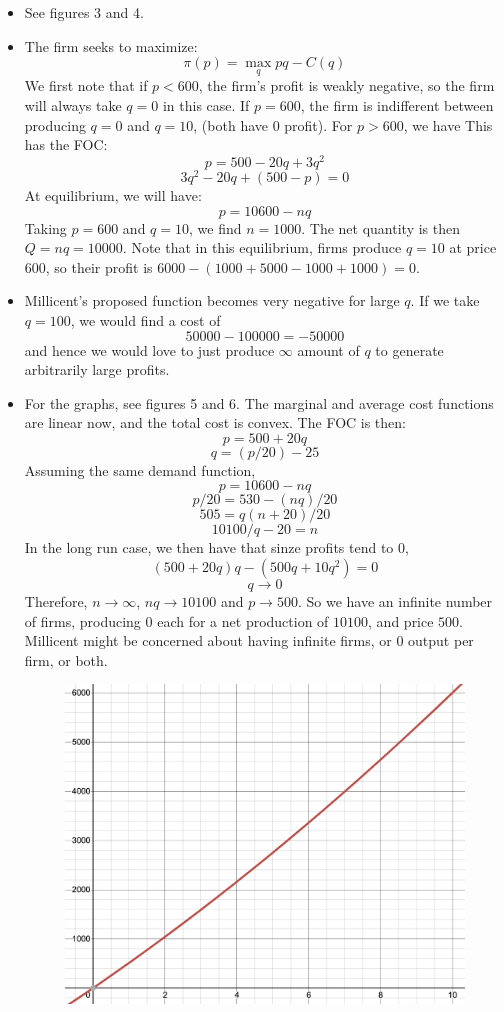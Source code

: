 \documentclass[10pt,letter]{article}
\begin{document}
\begin{itemize}
\begin{figure}
\end{figure}
\item See figures 3 and 4.
\item The firm seeks to maximize:
\[ \pi(p) = \max_q pq - C(q) \]
We first note that if $p < 600$, the firm's profit is weakly negative, so the firm will always take $q=0$ in this case. If $p = 600$, the firm is indifferent between producing $q=0$ and $q=10$, (both have 0 profit). For $p > 600$, we have
This has the FOC:
\[ p = 500 - 20q + 3q^2 \]
\[ 3q^2 - 20q + (500-p) = 0 \]
At equilibrium, we will have:
\[ p = 10600 - nq \]
Taking $p = 600$ and $q = 10$, we find $n=1000$. The net quantity is then $Q = nq = 10000$. Note that in this equilibrium, firms produce $q=10$ at price $600$, so their profit is $6000 - (1000 + 5000 - 1000 + 1000) = 0$.
\item Millicent's proposed function becomes very negative for large $q$. If we take $q = 100$, we would find a cost of
\[50000 - 100000 = -50000 \]
and hence we would love to just produce $\infty$ amount of $q$ to generate arbitrarily large profits.
\item For the graphs, see figures 5 and 6. The marginal and average cost functions are linear now, and the total cost is convex. The FOC is then:
\[ p = 500 + 20q \]
\[ q = (p/20) - 25 \]
Assuming the same demand function,
\[ p = 10600 - nq \]
\[ p/20 = 530 - (nq)/20 \]
\[ 505 = q (n+20)/20 \]
\[ 10100/q - 20 = n \]
In the long run case, we then have that sinze profits tend to 0,
\[ (500  + 20q) q - (500q + 10q^2) = 0 \]
\[ q \to 0 \]
 Therefore, $n\to \infty$, $nq \to 10100 $ and $p \to 500$. So we have an infinite number of firms, producing 0 each for a net production of $10100$, and price $500$. Millicent might be concerned about having infinite firms, or 0 output per firm, or both.
\begin{figure}
\centering
\includegraphics[scale=0.4]{ps5fig5}

\end{figure}
\end{itemize}
\end{document}
